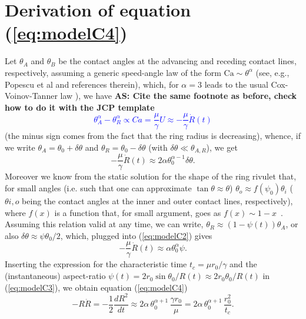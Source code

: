 \documentclass[%
 aip,
 amsmath,amssymb,
 reprint,%
]{revtex4-1}
\begin{document}
\section{Derivation of equation (\ref{eq:modelC4})}\label{sec:derivation}
Let $\theta_A$ and $\theta_B$ be the contact angles at the advancing and receding contact lines, respectively, assuming a generic speed-angle law of the form $\text{Ca} \sim \theta^{\alpha}$ (see, e.g., Popescu et al\cite{Popescu2012} and references therein), which, 
for $\alpha = 3$ leads to the usual Cox-Voinov-Tanner law \cite{SnoeijerARFM2013}), we have {\bf AS: Cite the same footnote as before,  check how to do it with 
the JCP template}
\textcolor{blue}{
\begin{equation}\label{eq:modelCV}
    \theta_A^{\alpha} - \theta_R^{\alpha} \propto Ca = \frac{\mu}{\gamma} U \approx - \frac{\mu}{\gamma} \dot{R}(t)
\end{equation}
}
(the minus sign comes from the fact that the ring radius is decreasing), whence, if we write $\theta_A = \theta_0 + \delta \theta$ and $\theta_R = \theta_0 - \delta \theta$ (with $\delta \theta \ll \theta_{A,R}$), we get
\begin{equation}\label{eq:modelC2}
    - \frac{\mu}{\gamma} \dot{R}(t) \approx 2 \alpha \theta_0^{\alpha-1} \delta \theta.
\end{equation}
Moreover we know from the static solution for the shape of the ring rivulet that, for small angles (i.e. such that one can approximate $\tan \theta \approx \theta$) $\theta_o \approx f(\psi_0) \theta_i$ ($\theta{i,o}$ being the contact angles at the inner and outer contact lines, respectively), where $f(x)$ is a function that, for small argument, goes as $f(x) \sim 1-x$~\cite{gonzalezStabilityLiquidRing2013}.
Assuming this relation valid at any time, we can write, $\theta_R \approx (1-\psi(t))\theta_A$, or also $\delta \theta \approx \psi \theta_0/2$, which, plugged into (\ref{eq:modelC2}) gives
\begin{equation}\label{eq:modelC3}
    - \frac{\mu}{\gamma} \dot{R}(t) \approx \alpha \theta_0^{\alpha} \psi.
\end{equation}
Inserting the expression for the characteristic time $t_c = \mu r_0/\gamma$ and the (instantaneous) aspect-ratio $\psi(t) = 2r_0\sin \theta_0/R(t) \approx 2 r_0\theta_0/R(t)$ in (\ref{eq:modelC3}), 
we obtain equation (\ref{eq:modelC4})
\begin{equation}
    -R\dot{R} = - \frac{1}{2}\frac{d R^2}{d t} \approx 2\alpha\, \theta_0^{\alpha +1} \, \frac{\gamma r_0}{\mu} = 2\alpha \, \theta_0^{\alpha +1} \, \frac{r_0^2}{t_c}.
\end{equation}

\nocite{*}
\end{document}
